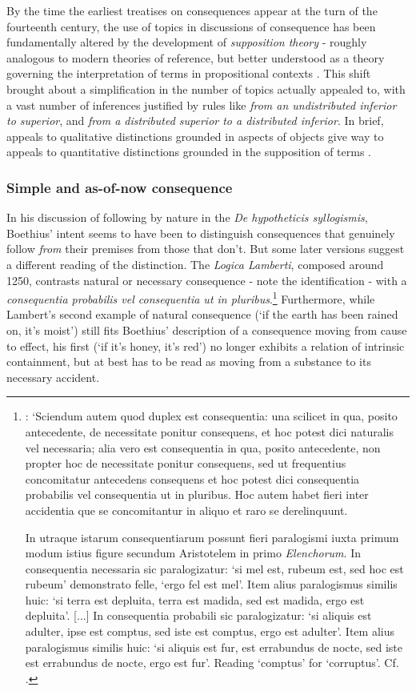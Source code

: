 \documentclass[]{article}
\begin{document}
By the time the earliest treatises on consequences appear at the turn of the fourteenth century, the use of topics in discussions of consequence has been fundamentally altered by the development of \textit{supposition theory} - roughly analogous to modern theories of reference, but better understood as a theory governing the interpretation of terms in propositional contexts \autocite{DutilhNovaes2007,DutilhNovaes2008b}. This shift brought about a simplification in the number of topics actually appealed to, with a vast number of inferences justified by rules like \textit{from an undistributed inferior to superior}, and \textit{from a distributed superior to a distributed inferior}. In brief, appeals to qualitative distinctions grounded in aspects of objects give way to appeals to quantitative distinctions grounded in the supposition of terms \autocite{Stump1982}.
\subsubsection{Simple and as-of-now consequence}
In his discussion of following by nature in the \textit{De hypotheticis syllogismis}, Boethius' intent seems to have been to distinguish consequences that genuinely follow \textit{from} their premises from those that don't. But some later versions suggest a different reading of the distinction. The \textit{Logica Lamberti}, composed around 1250, contrasts natural or necessary consequence - note the identification - with a \textit{consequentia probabilis vel consequentia ut in pluribus}.\footnote{\autocite[VII, pp. 195-196]{SummaLamberti}: `Sciendum autem quod duplex est consequentia: una scilicet in qua, posito antecedente, de necessitate ponitur consequens, et hoc potest dici naturalis vel necessaria; alia vero est consequentia in qua, posito antecedente, non propter hoc de necessitate ponitur consequens, sed ut frequentius concomitatur antecedens consequens et hoc potest dici consequentia probabilis vel consequentia ut in pluribus. Hoc autem habet fieri inter accidentia que se concomitantur in aliquo et raro se derelinquunt. 
	
In utraque istarum consequentiarum possunt fieri paralogismi iuxta primum modum istius figure secundum Aristotelem in primo \textit{Elenchorum}. In consequentia necessaria sic paralogizatur: `si mel est, rubeum est, sed hoc est rubeum' demonstrato felle, `ergo fel est mel'. Item alius paralogismus similis huic: `si terra est depluita, terra est madida, sed est madida, ergo est depluita'. [...] In consequentia probabili sic paralogizatur: `si aliquis est adulter, ipse est comptus, sed iste est comptus, ergo est adulter'. Item alius paralogismus similis huic: `si aliquis est fur, est errabundus de nocte, sed iste est errabundus de nocte, ergo est fur'. Reading `comptus' for `corruptus'. Cf. \autocite[V. p. 169.11-13]{PetrusTractatus}.} Furthermore, while Lambert's second example of natural consequence (`if the earth has been rained on, it's moist') still fits Boethius' description of a consequence moving from cause to effect, his first (`if it's honey, it's red') no longer exhibits a relation of intrinsic containment, but at best has to be read as moving from a substance to its necessary accident. 
\end{document}
